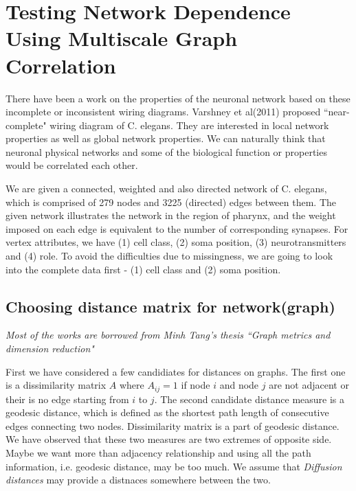 \documentclass[12pt]{report}
\begin{document}






\doublespace


\chapter{Testing Network Dependence Using Multiscale Graph Correlation} 
\normalsize


There have been a work on the properties of the neuronal network based on these incomplete or inconsistent wiring diagrams. Varshney et al(2011) proposed ``near-complete" wiring diagram of C. elegans. They are interested in local network properties as well as global network properties. We can naturally think that neuronal physical networks and some of the biological function or properties would be correlated each other.

We are given a connected, weighted and also directed network of C. elegans, which is comprised of 279 nodes and 3225 (directed) edges between them. The given network illustrates the network in the region of pharynx, and the weight imposed on each edge is equivalent to the number of corresponding synapses. For vertex attributes, we have (1) cell class, (2) soma position, (3) neurotransmitters and (4) role. To avoid the difficulties due to missingness, we are going to look into the complete data first - (1) cell class and (2) soma position.  

\section{Choosing distance matrix for network(graph)}

\textit{Most of the works are borrowed from Minh Tang's thesis ``Graph metrics and dimension reduction"}

First we have considered a few candidiates for distances on graphs. The first one is a dissimilarity matrix $A$ where $A_{ij} = 1$ if node $i$ and node $j$ are not adjacent or their is no edge starting from $i$ to $j$. The second candidate distance measure is a geodesic distance, which is defined as the shortest path length of consecutive edges connecting two nodes. Dissimilarity matrix is a part of geodesic distance. We have observed that these two measures are two extremes of opposite side. Maybe we want more than adjacency relationship and using all the path information, i.e. geodesic distance, may be too much. We assume that \textit{Diffusion distances} may provide a distnaces somewhere between the two. 
\end{document}
